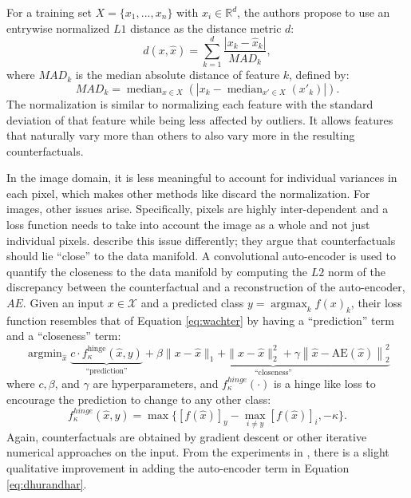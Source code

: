 \documentclass[11pt,a4paper,twoside,openright,final]{memoir}
\DeclareMathOperator*{\argmax}{\arg\max}
\DeclareMathOperator*{\argmin}{\arg\min}
\begin{document}
For a training set $X = \{ x_1, ..., x_n  \}$ with $x_i \in \mathbb{R}^d$, the authors propose to use an entrywise normalized $L1$ distance as the distance metric $d$:
\begin{equation}
    d(x, \hat x) = \sum_{k=1}^d \frac{|x_k - \hat x_k|}{MAD_k}, 
\end{equation}
where $MAD_k$ is the median absolute distance of feature $k$, defined by:
\begin{equation}\label{eq:MAD}
    MAD_k = \operatorname{median}_{x\in X} (|x_k - \operatorname{median}_{x'\in X}(x'_k)|).
\end{equation}
The normalization is similar to normalizing each feature with the standard deviation of that feature while being less affected by outliers. 
It allows features that naturally vary more than others to also vary more in the resulting counterfactuals. 

In the image domain, it is less meaningful to account for individual variances in each pixel, which makes other methods like \cite{Dhurandhar2018} discard the normalization.
For images, other issues arise.
Specifically, pixels are highly inter-dependent and a loss function needs to take into account the image as a whole and not just individual pixels. 
\citet{Dhurandhar2018} describe this issue differently;
they argue that counterfactuals should lie ``close'' to the data manifold.
A convolutional auto-encoder is used to quantify the closeness to the data manifold by computing the $L2$ norm of the discrepancy between the counterfactual and a reconstruction of the auto-encoder, $AE$.
Given an input $x\in \mathcal{X}$ and a predicted class $y = \argmax_k f(x)_k$, their loss function resembles that of Equation \eqref{eq:wachter} by having a ``prediction'' term and a ``closeness'' term:
\begin{equation}\label{eq:dhurandhar}
    \argmin_{\hat x} 
    \underbrace{ c \cdot f_{\kappa}^{\text{hinge}}\left(\hat x, y\right)}_{\text{``prediction''}}
    +
    \underbrace{\beta\|x-\hat x\|_1+\|x-\hat x\|_{2}^{2}+\gamma\left\|\hat x-\mathrm{AE}\left(\hat x \right)\right\|_{2}^{2}}_{\text{``closeness''}}
\end{equation}
where $c, \beta$, and $\gamma$ are hyperparameters, and $f_{\kappa}^{hinge} (\cdot)$ is a hinge like loss to encourage the prediction to change to any other class:
\begin{equation}
    f_{\kappa}^{hinge} (\hat x, y) = \max \{ \left[ f(\hat x)\right]_y - \max_{i\neq y}\left[ f(\hat x) \right]_i, -\kappa \}.
\end{equation}
Again, counterfactuals are obtained by gradient descent or other iterative numerical approaches on the input.
From the experiments in \cite{Dhurandhar2018}, there is a slight qualitative improvement in adding the auto-encoder term in Equation \eqref{eq:dhurandhar}. 
\end{document}

